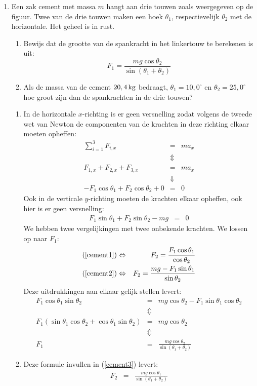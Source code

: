 \begin{enumerate}
\item Een zak cement met massa $m$ hangt aan drie touwen zoals weergegeven op de figuur. Twee van de drie touwen maken een hoek $\theta_1$, respectievelijk $\theta_2$ met de horizontale. Het geheel is in rust.
\begin{enumerate}
\item Bewijs dat de grootte van de spankracht in het linkertouw te berekenen is uit:
\[
F_1=\frac{mg\cos{\theta_2}}{\sin{(\theta_1+\theta_2)}}
\]
\item Als de massa van de cement $20,4\rm\,kg$ bedraagt, $\theta_1=10,0^\circ$ en $\theta_2=25,0^\circ$ hoe groot zijn dan de spankrachten in de drie touwen?
\end{enumerate}
\begin{oplossing}
\begin{enumerate}
\item In de horizontale $x$-richting is er geen versnelling zodat volgens de tweede wet van Newton de componenten van de krachten in deze rich\-ting elkaar moeten opheffen:
\begin{eqnarray}
\sum_{i=1}^3F_{i,x}&=&ma_x\nonumber\\
&\Updownarrow&\nonumber\\
F_{1,x}+F_{2,x}+F_{3,x}&=&ma_x\nonumber\\
&\Downarrow&\nonumber\\
-F_1\cos{\theta_1}+F_2\cos{\theta_2}+0&=&0\label{cement1}
\end{eqnarray}
Ook in de verticale $y$-richting moeten de krachten elkaar opheffen,
ook hier is er geen versnelling:
\begin{eqnarray}
F_1\sin{\theta_1}+F_2\sin{\theta_2}-mg&=&0\label{cement2}
\end{eqnarray}
We hebben twee vergelijkingen met twee onbekende krachten. We lossen
op naar $F_1$:
\begin{eqnarray}
(\ref{cement1})&\Leftrightarrow&F_2=\frac{F_1\cos{\theta_1}}{\cos{\theta_2}}\label{cement3}\\
(\ref{cement2})&\Leftrightarrow&F_2=\frac{mg-F_1\sin{\theta_1}}{\sin{\theta_2}}\nonumber
\end{eqnarray}
Deze uitdrukkingen aan elkaar gelijk stellen levert:
\begin{eqnarray*}
F_1\cos{\theta_1}\sin{\theta_2}&=&mg\cos{\theta_2}-F_1\sin{\theta_1}\cos{\theta_2}\\
&\Updownarrow&\\
F_1(\sin{\theta_1}\cos{\theta_2}+\cos{\theta_1}\sin{\theta_2})&=&mg\cos{\theta_2}\\
&\Updownarrow&\\
F_1&=&\frac{mg\cos{\theta_2}}{\sin{(\theta_1+\theta_2)}}
\end{eqnarray*}
\item Deze formule invullen in (\ref{cement3}) levert:
\begin{eqnarray*}
F_2&=&\frac{mg\cos{\theta_1}}{\sin{(\theta_1+\theta_2)}}
\end{eqnarray*}
\end{enumerate}
\end{oplossing}



\end{enumerate}
